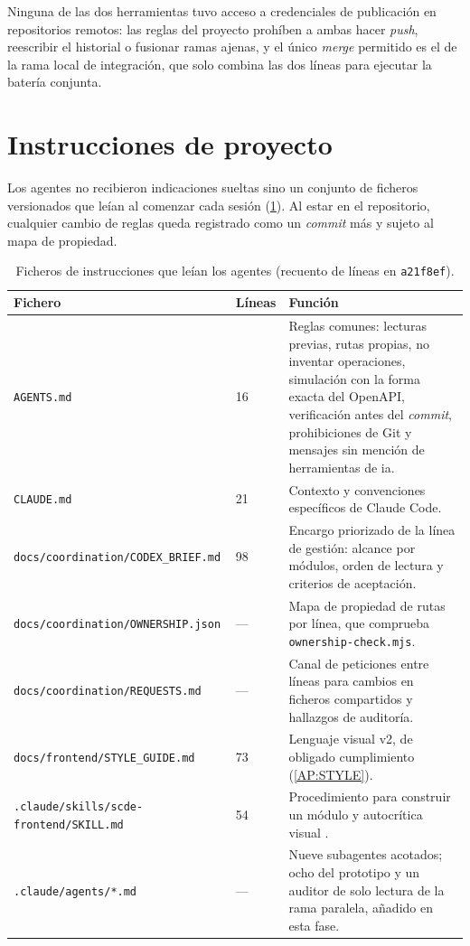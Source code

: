 Ninguna de las dos herramientas tuvo acceso a credenciales de publicación en repositorios
remotos: las reglas del proyecto prohíben a ambas hacer \textit{push}, reescribir el
historial o fusionar ramas ajenas, y el único \textit{merge} permitido es el de la rama local
de integración, que solo combina las dos líneas para ejecutar la batería conjunta.

\section*{Instrucciones de proyecto}

Los agentes no recibieron indicaciones sueltas sino un conjunto de ficheros versionados que
leían al comenzar cada sesión (\cref{TAB:AI-INSTRUCTIONS}). Al estar en el repositorio,
cualquier cambio de reglas queda registrado como un \textit{commit} más y sujeto al mapa de
propiedad.

\begin{table}[htbp]
  \centering
  \small
  \begin{tabular}{p{}p{}p{}}
    \toprule
    \textbf{Fichero} & \textbf{Líneas} & \textbf{Función} \\
    \midrule
    \texttt{AGENTS.md} & 16 & Reglas comunes: lecturas previas, rutas propias, no inventar
      operaciones, simulación con la forma exacta del OpenAPI, verificación antes del
      \textit{commit}, prohibiciones de Git y mensajes sin mención de herramientas de
      \acs{ia}. \\
    \texttt{CLAUDE.md} & 21 & Contexto y convenciones específicos de Claude Code. \\
    \texttt{docs/coordination/CODEX\_BRIEF.md} & 98 & Encargo priorizado de la línea de
      gestión: alcance por módulos, orden de lectura y criterios de aceptación. \\
    \texttt{docs/coordination/OWNERSHIP.json} & --- & Mapa de propiedad de rutas por
      línea, que comprueba \texttt{ownership-check.mjs}. \\
    \texttt{docs/coordination/REQUESTS.md} & --- & Canal de peticiones entre líneas para
      cambios en ficheros compartidos y hallazgos de auditoría. \\
    \texttt{docs/frontend/STYLE\_GUIDE.md} & 73 & Lenguaje visual v2, de obligado
      cumplimiento (\cref{AP:STYLE}). \\
    \texttt{.claude/skills/scde-frontend/SKILL.md} & 54 & Procedimiento para construir un
      módulo y autocrítica visual \cite{anthropic_skills_frontend_design}. \\
    \texttt{.claude/agents/*.md} & --- & Nueve subagentes acotados; ocho del prototipo y un
      auditor de solo lectura de la rama paralela, añadido en esta fase. \\
    \bottomrule
  \end{tabular}
  \caption{Ficheros de instrucciones que leían los agentes (recuento de líneas en
    \texttt{a21f8ef}).\label{TAB:AI-INSTRUCTIONS}}
\end{table}

